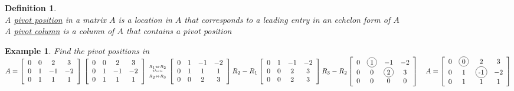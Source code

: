 \documentclass[a4paper,12pt,openany]{book}
\newcommand*{\bfrac}[2]{\genfrac{}{}{0pt}{}{#1}{#2}}
\newcommand*\circled[1]{\tikz[baseline=(char.base)]{
            \node[shape=circle,draw,inner sep=2pt] (char) {#1};}}
\theoremstyle{defn}
\newtheorem{defn}{Definition}[section]
\theoremstyle{expl}
\newtheorem{expl}{Example}[section]
\begin{document}
\begin{defn}\textup{\-\\
	A \underline{pivot position} in a matrix $A$ is a location in $A$ that corresponds to a leading entry in an echelon form of $A$\\
	A \underline{pivot column} is a column of $A$ that contains a pivot position  
}\end{defn}
\begin{expl}\textup{
Find the pivot positions in $A = \left[\begin{array}{cccc}0&0&2&3\\0&1&-1&-2\\0&1&1&1\end{array}\right]\\
\left[\begin{array}{cccc}0&0&2&3\\0&1&-1&-2\\0&1&1&1\end{array}\right] \bfrac{\bfrac{R_1\Leftrightarrow R_2}{then}}{\bfrac{}{R_2\Leftrightarrow R_3}}\left[\begin{array}{cccc}0&1&-1&-2\\0&1&1&1\\0&0&2&3\end{array}\right]R_2-R_1\left[\begin{array}{cccc}0&1&-1&-2\\0&0&2&3\\0&0&2&3\end{array}\right]\\R_3-R_2\left[\begin{array}{cccc}0&\circled{1}&-1&-2\\0&0&\circled{2}&3\\0&0&0&0\end{array}\right]\quad A = \left[\begin{array}{cccc}0&\circled{0}&2&3\\0&1&\circled{-1}&-2\\0&1&1&1\end{array}\right]
$}\end{expl}
\end{document}
